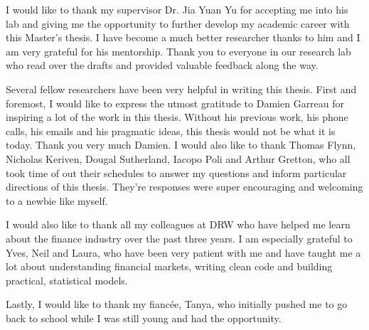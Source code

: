 \begin{acknowledgments}
  
I would like to thank my supervisor Dr. Jia Yuan Yu for accepting me into his lab and giving me the opportunity to further develop my academic career with this Master's thesis. I have become a much better researcher thanks to him and I am very grateful for his mentorship. Thank you to everyone in our research lab who read over the drafts and provided valuable feedback along the way.
  
Several fellow researchers have been very helpful in writing this thesis. First and foremost, I would like to express the utmost gratitude to Damien Garreau for inspiring a lot of the work in this thesis. Without his previous work, his phone calls, his emails and his pragmatic ideas, this thesis would not be what it is today. Thank you very much Damien. I would also like to thank Thomas Flynn, Nicholas Keriven, Dougal Sutherland, Iacopo Poli and Arthur Gretton, who all took time of out their schedules to answer my questions and inform particular directions of this thesis. They're responses were super encouraging and welcoming to a newbie like myself.
  
I would also like to thank all my colleagues at DRW who have helped me learn about the finance industry over the past three years. I am especially grateful to Yves, Neil and Laura, who have been very patient with me and have taught me a lot about understanding financial markets, writing clean code and building practical, statistical models.
  
Lastly, I would like to thank my fiancée, Tanya, who initially pushed me to go back to school while I was still young and had the opportunity. 
\end{acknowledgments}

